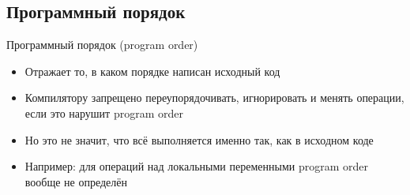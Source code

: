\ifrender
\subsection{Программный порядок}
\begin{frame}{Программный порядок (program order)}
\begin{itemize}[<+->]
\item Отражает то, в каком порядке написан исходный код
\item Компилятору запрещено переупорядочивать, игнорировать и менять операции, если это нарушит program order
\item Но это не значит, что всё выполняется именно так, как в исходном коде
\item Например: для операций над локальными переменными program order вообще не определён
\end{itemize}
\end{frame}
\fi
